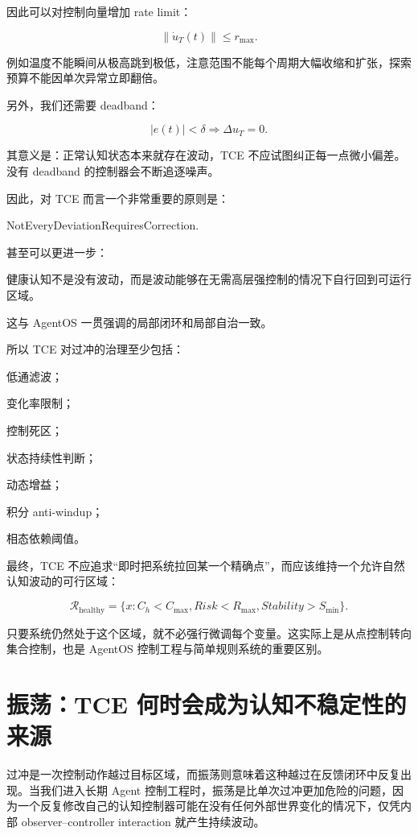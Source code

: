 因此可以对控制向量增加 rate limit：

\[
\|\dot u_T(t)\|
\le
r_{\max}.
\]

例如温度不能瞬间从极高跳到极低，注意范围不能每个周期大幅收缩和扩张，探索预算不能因单次异常立即翻倍。

另外，我们还需要 deadband：

\[
|e(t)|<\delta
\Rightarrow
\Delta u_T=0.
\]

其意义是：正常认知状态本来就存在波动，TCE 不应试图纠正每一点微小偏差。没有 deadband 的控制器会不断追逐噪声。

因此，对 TCE 而言一个非常重要的原则是：

\begin{statementbox}
NotEveryDeviationRequiresCorrection.
\end{statementbox}

甚至可以更进一步：

\begin{statementbox}
健康认知不是没有波动，而是波动能够在无需高层强控制的情况下自行回到可运行区域。
\end{statementbox}

这与 AgentOS 一贯强调的局部闭环和局部自治一致。

所以 TCE 对过冲的治理至少包括：

低通滤波；

变化率限制；

控制死区；

状态持续性判断；

动态增益；

积分 anti-windup；

相态依赖阈值。

最终，TCE 不应追求“即时把系统拉回某一个精确点”，而应该维持一个允许自然认知波动的可行区域：

\[
\boxed{
\mathcal R_{\mathrm{healthy}}
=
\{
x:
C_h<C_{\max},
Risk<R_{\max},
Stability>S_{\min}
\}.
}
\]

只要系统仍然处于这个区域，就不必强行微调每个变量。这实际上是从点控制转向集合控制，也是 AgentOS 控制工程与简单规则系统的重要区别。

\section{振荡：TCE 何时会成为认知不稳定性的来源}

过冲是一次控制动作越过目标区域，而振荡则意味着这种越过在反馈闭环中反复出现。当我们进入长期 Agent 控制工程时，振荡是比单次过冲更加危险的问题，因为一个反复修改自己的认知控制器可能在没有任何外部世界变化的情况下，仅凭内部 observer--controller interaction 就产生持续波动。

